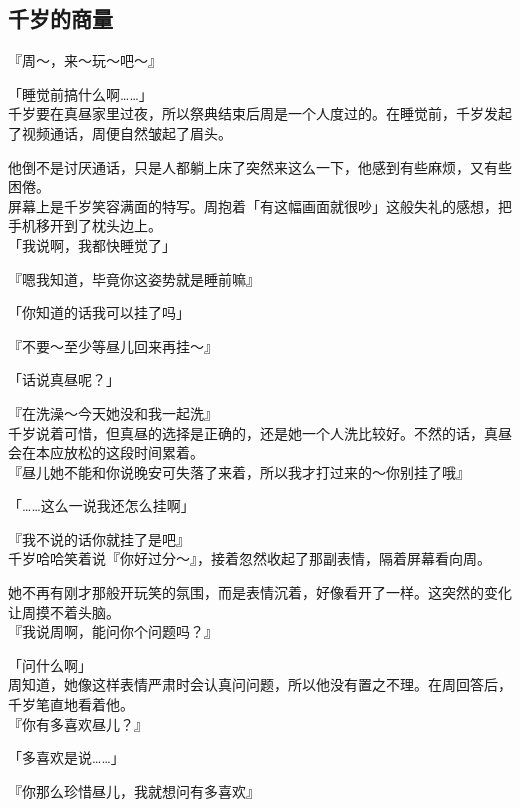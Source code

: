 \subsection{千岁的商量}

『周～，来～玩～吧～』

「睡觉前搞什么啊……」\\

千岁要在真昼家里过夜，所以祭典结束后周是一个人度过的。在睡觉前，千岁发起了视频通话，周便自然皱起了眉头。

他倒不是讨厌通话，只是人都躺上床了突然来这么一下，他感到有些麻烦，又有些困倦。\\

屏幕上是千岁笑容满面的特写。周抱着「有这幅画面就很吵」这般失礼的感想，把手机移开到了枕头边上。\\

「我说啊，我都快睡觉了」

『嗯我知道，毕竟你这姿势就是睡前嘛』

「你知道的话我可以挂了吗」

『不要～至少等昼儿回来再挂～』

「话说真昼呢？」

『在洗澡～今天她没和我一起洗』\\

千岁说着可惜，但真昼的选择是正确的，还是她一个人洗比较好。不然的话，真昼会在本应放松的这段时间累着。\\

『昼儿她不能和你说晚安可失落了来着，所以我才打过来的～你别挂了哦』

「……这么一说我还怎么挂啊」

『我不说的话你就挂了是吧』\\

千岁哈哈笑着说『你好过分～』，接着忽然收起了那副表情，隔着屏幕看向周。

她不再有刚才那般开玩笑的氛围，而是表情沉着，好像看开了一样。这突然的变化让周摸不着头脑。\\

『我说周啊，能问你个问题吗？』

「问什么啊」\\

周知道，她像这样表情严肃时会认真问问题，所以他没有置之不理。在周回答后，千岁笔直地看着他。\\

『你有多喜欢昼儿？』

「多喜欢是说……」

『你那么珍惜昼儿，我就想问有多喜欢』\\

